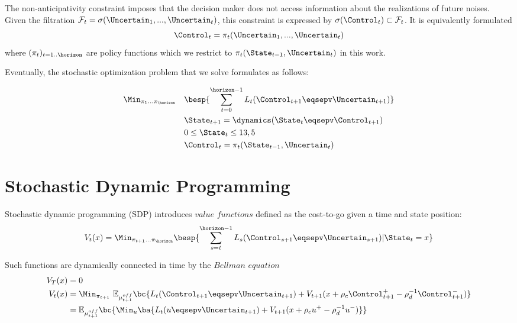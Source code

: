 \documentclass[10pt,a4paper]{article}
\begin{document}
\noindent The non-anticipativity constraint imposes that the decision maker does not access information about the realizations of future noises. Given the filtration $\mathcal{F}_t = \sigma(\Uncertain_1, ..., \Uncertain_t)$, this constraint is expressed by $\sigma(\Control_t) \subset \mathcal{F}_t$. It is equivalently formulated 
\[\Control_t = \pi_t(\Uncertain_1, ..., \Uncertain_t) \]
\noindent where $(\pi_t)_{t=1..\horizon}$ are policy functions which we restrict to $\pi_t(\State_{t-1}, \Uncertain_t)$ in this work.  

\vspace{0.5cm}

\noindent Eventually, the stochastic optimization problem that we solve formulates as follows:

\begin{equation}
\begin{aligned}
& \Min_{\pi_1 ... \pi_\horizon} 
& & \besp{\sum_{t=0}^{\horizon-1} L_t(\Control_{t+1} \eqsepv \Uncertain_{t+1})} \\
&&& \State_{t+1} =  \dynamics(\State_t \eqsepv \Control_{t+1}) \\
&&& 0 \leq \State_t \leq 13,5 \\
&&& \Control_t = \pi_t(\State_{t-1}, \Uncertain_t)
\end{aligned}
\label{eq1.1}
\end{equation}

\section{Stochastic Dynamic Programming}

Stochastic dynamic programming (SDP) introduces $\textit{value functions}$ defined as the cost-to-go given a time and state position:
\[ V_t(x) = \Min_{\pi_{t+1} ... \pi_\horizon} \besp{\sum_{s=t}^{\horizon-1} L_s(\Control_{s+1} \eqsepv \Uncertain_{s+1}) | \State_t = x} \]

\noindent Such functions are dynamically connected in time by the $\textit{Bellman equation}$
\begin{equation}
\begin{aligned}
V_T(x) &=  0  \\
V_t(x) &= \Min_{\pi_{t+1}} \ \mathbb{E}_{\mu_{t+1}^{off}} \bc{L_t(\Control_{t+1} \eqsepv \Uncertain_{t+1}) + V_{t+1}(x + \rho_c \Control_{t+1}^+ -\rho_d^{-1} \Control_{t+1}^-)} \\
&= \mathbb{E}_{\mu_{t+1}^{off}} \bc{ \Min_u \ba{L_t(u \eqsepv \Uncertain_{t+1}) + V_{t+1}(x + \rho_c u^+ -\rho_d^{-1} u^-)}} 
\end{aligned}
\end{equation}
\end{document}
